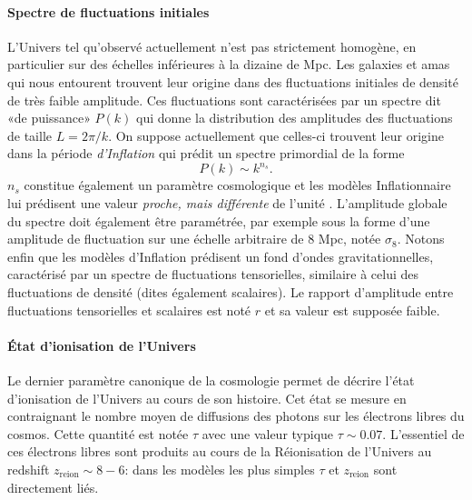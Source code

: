 \paragraph{Spectre de fluctuations initiales} L'Univers tel qu'observé actuellement n'est pas strictement homogène, en particulier sur des échelles inférieures à la dizaine de Mpc. Les galaxies et amas qui nous entourent trouvent leur origine dans des fluctuations initiales de densité de très faible amplitude. Ces fluctuations sont caractérisées par un spectre dit «de puissance»  $P(k)$ qui donne la distribution des amplitudes des fluctuations de taille $L=2\pi/k$. On suppose actuellement que celles-ci trouvent leur origine dans la période \textit{d'Inflation} qui prédit un spectre primordial de la forme  
\begin{equation}
P(k)\sim  k^{n_s}.
\end{equation} 
$n_s$ constitue également un paramètre cosmologique et les modèles Inflationnaire lui prédisent une valeur \textit{proche, mais différente} de l'unité . L'amplitude globale du spectre doit également être paramétrée, par exemple sous la forme d'une amplitude de fluctuation sur une échelle arbitraire de 8 Mpc, notée $\sigma_8$. Notons enfin que les modèles d'Inflation prédisent un fond d'ondes gravitationnelles, caractérisé par un spectre de fluctuations tensorielles, similaire à celui des fluctuations de densité (dites également scalaires). Le rapport d'amplitude entre fluctuations tensorielles et scalaires est noté $r$ et sa valeur est supposée faible.

\paragraph{État d'ionisation de l'Univers} Le dernier paramètre canonique de la cosmologie permet de décrire l'état d'ionisation  de l'Univers au cours de son histoire. Cet état se mesure en  contraignant le nombre moyen de diffusions des photons sur les électrons libres du cosmos. Cette quantité est notée $\tau$ avec une valeur typique $\tau \sim 0.07$. L'essentiel de ces électrons libres sont produits au cours de la Réionisation  de l'Univers au redshift $z_\mathrm{reion}\sim 8-6$: dans les modèles les plus simples $\tau$ et $z_\mathrm{reion}$ sont directement liés.

